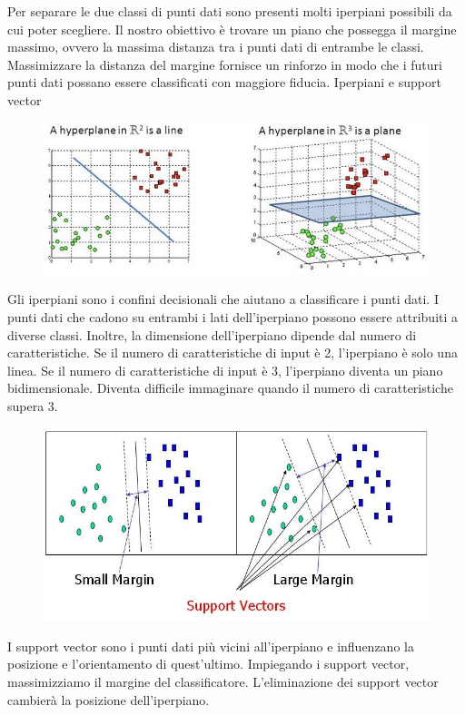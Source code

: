 Per separare le due classi di punti dati sono presenti molti iperpiani possibili da cui poter scegliere. Il nostro obiettivo è trovare un piano che possegga il margine massimo, ovvero la massima distanza tra i punti dati di entrambe le classi. Massimizzare la distanza del margine fornisce un rinforzo in modo che i futuri punti dati possano essere classificati con maggiore fiducia.
Iperpiani e support vector

\begin{figure}
    \begin{center}    
        \includegraphics[width=0.9\linewidth]{images/image27.jpeg}
    \end{center}
\end{figure}
Gli iperpiani sono i confini decisionali che aiutano a classificare i punti dati. 
I punti dati che cadono su entrambi i lati dell'iperpiano possono essere attribuiti a diverse classi. 
Inoltre, la dimensione dell’iperpiano  dipende dal numero di caratteristiche. 
Se il numero di caratteristiche di input è 2, l'iperpiano è solo una linea. Se il numero di caratteristiche di input è 3, l'iperpiano diventa un piano bidimensionale. Diventa difficile immaginare quando il numero di caratteristiche supera 3.

\begin{figure}
    \begin{center}    
        \includegraphics[width=0.9\linewidth]{images/image28.jpeg}
    \end{center}
\end{figure}
I support vector sono i punti dati più vicini all'iperpiano e inﬂuenzano la posizione e l'orientamento di quest’ultimo. Impiegando i support vector, massimizziamo il margine del classificatore. L’eliminazione  dei support vector cambierà la posizione dell'iperpiano. 


